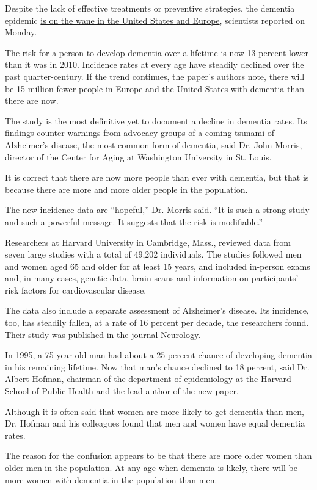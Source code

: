 Despite the lack of effective treatments or preventive strategies, the
dementia epidemic
\href{https://n.neurology.org/content/early/2020/07/01/WNL.0000000000010022}{is
on the wane in the United States and Europe}, scientists reported on
Monday.

The risk for a person to develop dementia over a lifetime is now 13
percent lower than it was in 2010. Incidence rates at every age have
steadily declined over the past quarter-century. If the trend continues,
the paper's authors note, there will be 15 million fewer people in
Europe and the United States with dementia than there are now.

The study is the most definitive yet to document a decline in dementia
rates. Its findings counter warnings from advocacy groups of a coming
tsunami of Alzheimer's disease, the most common form of dementia, said
Dr. John Morris, director of the Center for Aging at Washington
University in St. Louis.

It is correct that there are now more people than ever with dementia,
but that is because there are more and more older people in the
population.

The new incidence data are ``hopeful,'' Dr. Morris said. ``It is such a
strong study and such a powerful message. It suggests that the risk is
modifiable.''

Researchers at Harvard University in Cambridge, Mass., reviewed data
from seven large studies with a total of 49,202 individuals. The studies
followed men and women aged 65 and older for at least 15 years, and
included in-person exams and, in many cases, genetic data, brain scans
and information on participants' risk factors for cardiovascular
disease.

The data also include a separate assessment of Alzheimer's disease. Its
incidence, too, has steadily fallen, at a rate of 16 percent per decade,
the researchers found. Their study was published in the journal
Neurology.

In 1995, a 75-year-old man had about a 25 percent chance of developing
dementia in his remaining lifetime. Now that man's chance declined to 18
percent, said Dr. Albert Hofman, chairman of the department of
epidemiology at the Harvard School of Public Health and the lead author
of the new paper.

Although it is often said that women are more likely to get dementia
than men, Dr. Hofman and his colleagues found that men and women have
equal dementia rates.

The reason for the confusion appears to be that there are more older
women than older men in the population. At any age when dementia is
likely, there will be more women with dementia in the population than
men.

